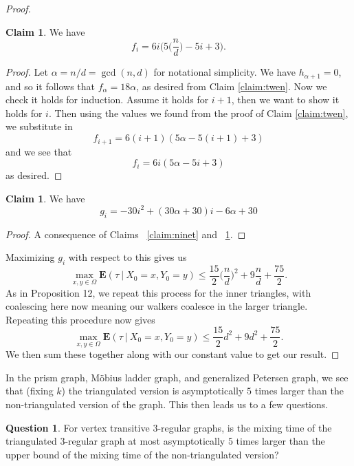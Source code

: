 \documentclass[10pt,a4paper]{amsart}
\theoremstyle{definition}
\numberwithin{definition}{section}
\newtheorem{claim}[definition]{Claim}
\newtheorem{question}[definition]{Question}
\begin{document}
\begin{proof}
\begin{claim}\label{claim:twenty}
We have
\[f_i = 6i \Bigg(5 \bigg(\frac{n}{d}\bigg) - 5i + 3\Bigg). \]
\end{claim}

\begin{proof}
Let $\alpha = n/d = \gcd(n,d)$ for notational simplicity. We have $h_{\alpha+1} = 0$, and so it follows that $f_{\alpha} = 18\alpha$, as desired from Claim \ref{claim:twen}. Now we check it holds for induction. Assume it holds for $i+1$, then we want to show it holds for $i$. Then using the values we found from the proof of Claim \ref{claim:twen}, we substitute in
\[f_{i+1} = 6(i+1) \left( 5\alpha - 5(i+1) + 3\right) \]
and we see that
\[f_i = 6i(5 \alpha-5i+3) \]
as desired.   
\end{proof}

\begin{claim}
We have
\[g_i = -30{i}^{2}+ \left( 30 \alpha +30 \right) i-6 \alpha +30 \]
\end{claim}

\begin{proof}
A consequence of Claims ~\ref{claim:ninet} and ~\ref{claim:twenty}.
\end{proof}

\noindent Maximizing $g_i$ with respect to this gives us
\[\max_{x,y \in \Omega} \mathbf{E}(\tau \ | \ X_0 = x, Y_0 =y) \leq \frac{15}{2} \bigg(\frac{n}{d}\bigg)^2 + 9 \frac{n}{d} + \frac{75}{2}. \]
As in Proposition 12, we repeat this process for the inner triangles, with coalescing here now meaning our walkers coalesce in the larger triangle. Repeating this procedure now gives 
\[\max_{x,y \in \Omega} \mathbf{E}(\tau \ | \ X_0 = x, Y_0 =y) \leq \frac{15}{2} d^2 + 9 d^2 + \frac{75}{2}. \]
We then sum these together along with our constant value to get our result.
\end{proof}

In the prism graph, M\"{o}bius ladder graph, and generalized Petersen graph, we see that (fixing $k$) the triangulated version is asymptotically $5$ times larger than the non-triangulated version of the graph. This then leads us to a few questions.

\begin{question}\label{question:one}
For vertex transitive $3$-regular graphs, is the mixing time of the triangulated $3$-regular graph at most asymptotically $5$ times larger than the upper bound of the mixing time of the non-triangulated version?
\end{question}
\end{document}
